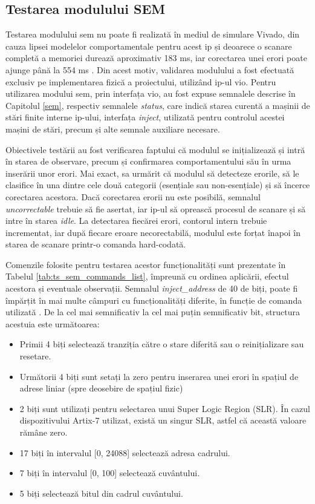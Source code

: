 \documentclass[12pt,a4paper]{report}
\begin{document}
\subsection{Testarea modulului SEM}
Testarea modulului \acrfull{sem} nu poate fi realizată în mediul de simulare Vivado, din cauza lipsei modelelor comportamentale pentru acest \gls{ip} și deoarece o scanare completă a memoriei durează aproximativ 183 ms, iar corectarea unei erori poate ajunge până la 554 ms \cite{pg036}. Din acest motiv, validarea modulului a fost efectuată exclusiv pe implementarea fizică a proiectului, utilizând \gls{ip}-ul \gls{vio}. Pentru utilizarea modului \gls{sem}, prin interfața \gls{vio}, au fost expuse semnalele descrise în Capitolul \ref{sem}, respectiv semnalele \textit{status}, care indică starea curentă a mașinii de stări finite interne \gls{ip}-ului, interfața \textit{inject}, utilizată pentru controlul acestei mașini de stări, precum și alte semnale auxiliare necesare.

Obiectivele testării au fost verificarea faptului că modulul se inițializează și intră în starea de observare, precum și confirmarea comportamentului său în urma inserării unor erori. Mai exact, sa urmărit că modulul să detecteze erorile, să le clasifice în una dintre cele două categorii (esențiale sau non-esențiale) și să încerce corectarea acestora. Dacă corectarea erorii nu este posibilă, semnalul \textit{uncorrectable} trebuie să fie asertat, iar \gls{ip}-ul să oprească procesul de scanare și să intre în starea \textit{idle}. La detectarea fiecărei erori, contorul intern trebuie incrementat, iar după fiecare eroare necorectabilă, modulul este forțat înapoi în starea de scanare printr-o comanda hard-codată.

Comenzile folosite pentru testarea acestor funcționalități sunt prezentate în Tabelul \ref{tab:ts_sem_commands_list}, împreună cu ordinea aplicării, efectul acestora și eventuale observații. Semnalul \textit{inject\_address} de 40 de biți, poate fi împărțit în mai multe câmpuri cu funcționalități diferite, în funcție de comanda utilizată \cite{pg036}. De la cel mai semnificativ la cel mai puțin semnificativ bit, structura acestuia este următoarea:
\begin{itemize}
    \item Primii 4 biți selectează tranziția către o stare diferită sau o reinițializare sau resetare.
    \item Următorii 4 biți sunt setați la zero pentru inserarea unei erori în spațiul de adrese liniar (spre deosebire de spațiul fizic)
    \item 2 biți sunt utilizați pentru selectarea unui Super Logic Region (SLR). În cazul dispozitivului Artix-7 utilizat, există un singur SLR, astfel că această valoare rămâne zero.
    \item 17 biți în intervalul [0, 24088] selectează adresa cadrului.
    \item 7 biți în intervalul [0, 100] selectează cuvântului.
    \item 5 biți selectează bitul din cadrul cuvântului.
\end{itemize}
\end{document}
